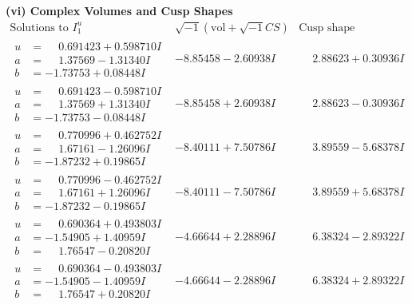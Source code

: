 \documentclass[1p]{elsarticle_modified}
\theoremstyle{definition}
\newcommand{\I}{\sqrt{-1}}
\begin{document}
\newpage\flushleft \textbf{(vi) Complex Volumes and Cusp Shapes}
$$\begin{array}{c|c|c}  
\text{Solutions to }I^u_{1}& \I (\text{vol} + \sqrt{-1}CS) & \text{Cusp shape}\\
 \hline 
\begin{aligned}
u &= \phantom{-}0.691423 + 0.598710 I \\
a &= \phantom{-}1.37569 - 1.31340 I \\
b &= -1.73753 + 0.08448 I\end{aligned}
 & -8.85458 - 2.60938 I & \phantom{-}2.88623 + 0.30936 I \\ \hline\begin{aligned}
u &= \phantom{-}0.691423 - 0.598710 I \\
a &= \phantom{-}1.37569 + 1.31340 I \\
b &= -1.73753 - 0.08448 I\end{aligned}
 & -8.85458 + 2.60938 I & \phantom{-}2.88623 - 0.30936 I \\ \hline\begin{aligned}
u &= \phantom{-}0.770996 + 0.462752 I \\
a &= \phantom{-}1.67161 - 1.26096 I \\
b &= -1.87232 + 0.19865 I\end{aligned}
 & -8.40111 + 7.50786 I & \phantom{-}3.89559 - 5.68378 I \\ \hline\begin{aligned}
u &= \phantom{-}0.770996 - 0.462752 I \\
a &= \phantom{-}1.67161 + 1.26096 I \\
b &= -1.87232 - 0.19865 I\end{aligned}
 & -8.40111 - 7.50786 I & \phantom{-}3.89559 + 5.68378 I \\ \hline\begin{aligned}
u &= \phantom{-}0.690364 + 0.493803 I \\
a &= -1.54905 + 1.40959 I \\
b &= \phantom{-}1.76547 - 0.20820 I\end{aligned}
 & -4.66644 + 2.28896 I & \phantom{-}6.38324 - 2.89322 I \\ \hline\begin{aligned}
u &= \phantom{-}0.690364 - 0.493803 I \\
a &= -1.54905 - 1.40959 I \\
b &= \phantom{-}1.76547 + 0.20820 I\end{aligned}
 & -4.66644 - 2.28896 I & \phantom{-}6.38324 + 2.89322 I \\ \hline\begin{aligned}

\end{aligned}
\end{array}$$
\end{document}
